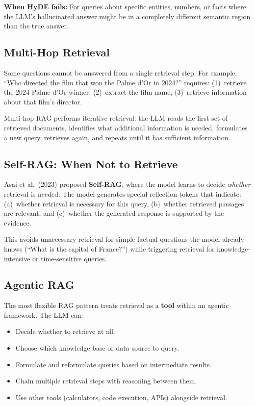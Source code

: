 \textbf{When HyDE fails:}  For queries about specific entities, numbers, or
facts where the LLM's hallucinated answer might be in a completely different
semantic region than the true answer.

\subsection{Multi-Hop Retrieval}

Some questions cannot be answered from a single retrieval step.  For example,
``Who directed the film that won the Palme d'Or in 2024?'' requires:
(1)~retrieve the 2024 Palme d'Or winner, (2)~extract the film name,
(3)~retrieve information about that film's director.

Multi-hop RAG performs iterative retrieval: the LLM reads the first set of
retrieved documents, identifies what additional information is needed,
formulates a new query, retrieves again, and repeats until it has sufficient
information.

\subsection{Self-RAG: When Not to Retrieve}

Asai et al.\ (2023) proposed \textbf{Self-RAG}, where the model learns to
decide \emph{whether} retrieval is needed.  The model generates special
reflection tokens that indicate: (a)~whether retrieval is necessary for this
query, (b)~whether retrieved passages are relevant, and (c)~whether the
generated response is supported by the evidence.

This avoids unnecessary retrieval for simple factual questions the model
already knows (``What is the capital of France?'') while triggering retrieval
for knowledge-intensive or time-sensitive queries.

\subsection{Agentic RAG}

The most flexible RAG pattern treats retrieval as a \textbf{tool} within an
agentic framework.  The LLM can:
\begin{itemize}
    \item Decide whether to retrieve at all.
    \item Choose which knowledge base or data source to query.
    \item Formulate and reformulate queries based on intermediate results.
    \item Chain multiple retrieval steps with reasoning between them.
    \item Use other tools (calculators, code execution, APIs) alongside
          retrieval.
\end{itemize}

